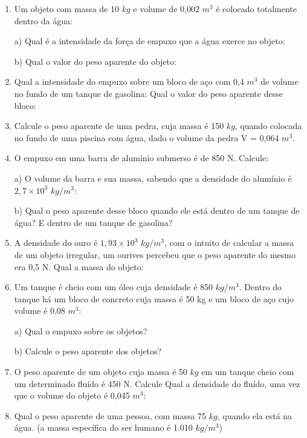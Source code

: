 \documentclass[12pt,a4paper]{book}
\begin{document}
		
		\begin{enumerate}
		
		\item Um objeto com massa de 10 $kg$ e volume de 0,002 $m^3$ é colocado totalmente dentro da água:
		
		\par a) Qual é a intensidade da força de empuxo que a água exerce no objeto:		
		\par b) Qual o valor do peso aparente do objeto:
		
		\item Qual a intensidade do empuxo sobre um bloco de aço com 0,4 $m^3$ de volume no fundo de um tanque de gasolina: Qual o valor do peso aparente desse bloco:
		
		\item Calcule o peso aparente de uma pedra, cuja massa é 150 $kg$, quando colocada no fundo de uma piscina com água, dado o volume da pedra V = 0,064 $m^3$. 
				
		\item O empuxo em uma barra de alumínio submerso é de 850 N. Calcule:
		\par a) O volume da barra e sua massa, sabendo que a densidade do alumínio é $2,7 \times 10^3$ $kg/m^3$:
		\par b) Qual o peso aparente desse bloco quando ele está dentro de um tanque de água? E dentro de um tanque de gasolina?
			
		\item A densidade do ouro é $1,93 \times 10^3$ $kg/m^3$, com o intuito de calcular a massa de um objeto irregular, um ourives percebeu que o peso aparente do mesmo era 0,5 N. Qual a massa do objeto:
		
		\item Um tanque é cheio com um óleo cuja densidade é 850 $kg/m^3$. Dentro do tanque há um bloco de concreto cuja massa é 50 kg e um bloco de aço cujo volume é 0,08 $m^3$:
		\par a) Qual o empuxo sobre os objetos?
		\par b) Calcule o peso aparente dos objetos?
		
		\item O peso aparente de um objeto cuja massa é 50 $kg$ em um tanque cheio com um determinado fluído é 450 N. Calcule Qual a densidade do fluído, uma vez que o volume do objeto é 0,045 $m^3$:
		
		\item Qual o peso aparente de uma pessoa, com massa 75 $kg$, quando ela está na água. (a massa específica do ser humano é 1.010 $kg/m^3$)
		

\end{enumerate}
\end{document}
